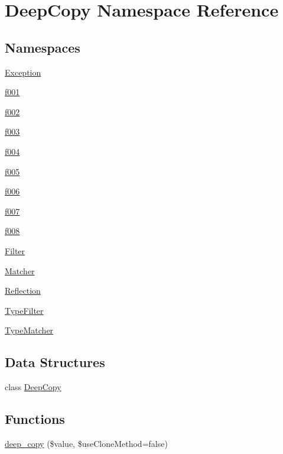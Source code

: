 \hypertarget{namespace_deep_copy}{}\section{Deep\+Copy Namespace Reference}
\label{namespace_deep_copy}
\subsection*{Namespaces}
\begin{DoxyCompactItemize}
\item 
 \mbox{\hyperlink{namespace_deep_copy_1_1_exception}{Exception}}
\item 
 \mbox{\hyperlink{namespace_deep_copy_1_1f001}{f001}}
\item 
 \mbox{\hyperlink{namespace_deep_copy_1_1f002}{f002}}
\item 
 \mbox{\hyperlink{namespace_deep_copy_1_1f003}{f003}}
\item 
 \mbox{\hyperlink{namespace_deep_copy_1_1f004}{f004}}
\item 
 \mbox{\hyperlink{namespace_deep_copy_1_1f005}{f005}}
\item 
 \mbox{\hyperlink{namespace_deep_copy_1_1f006}{f006}}
\item 
 \mbox{\hyperlink{namespace_deep_copy_1_1f007}{f007}}
\item 
 \mbox{\hyperlink{namespace_deep_copy_1_1f008}{f008}}
\item 
 \mbox{\hyperlink{namespace_deep_copy_1_1_filter}{Filter}}
\item 
 \mbox{\hyperlink{namespace_deep_copy_1_1_matcher}{Matcher}}
\item 
 \mbox{\hyperlink{namespace_deep_copy_1_1_reflection}{Reflection}}
\item 
 \mbox{\hyperlink{namespace_deep_copy_1_1_type_filter}{Type\+Filter}}
\item 
 \mbox{\hyperlink{namespace_deep_copy_1_1_type_matcher}{Type\+Matcher}}
\end{DoxyCompactItemize}
\subsection*{Data Structures}
\begin{DoxyCompactItemize}
\item 
class \mbox{\hyperlink{class_deep_copy_1_1_deep_copy}{Deep\+Copy}}
\end{DoxyCompactItemize}
\subsection*{Functions}
\begin{DoxyCompactItemize}
\item 
\mbox{\hyperlink{namespace_deep_copy_a9fb9a0a04a3453639d27a6d6fba4a2b6}{deep\+\_\+copy}} (\$value, \$use\+Clone\+Method=false)
\end{DoxyCompactItemize}


